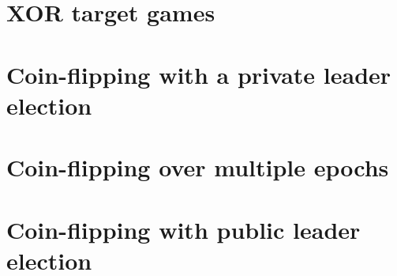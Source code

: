
\chapter{XOR target games}\label{sec:xor-games}


\chapter{Coin-flipping with a private leader election}\label{sec:coin-tossing}


\chapter{Coin-flipping over multiple epochs}\label{sec:composing-xor-games}\label{sec:beacon}



\chapter{Coin-flipping with public leader election}\label{app:bernoulli}




